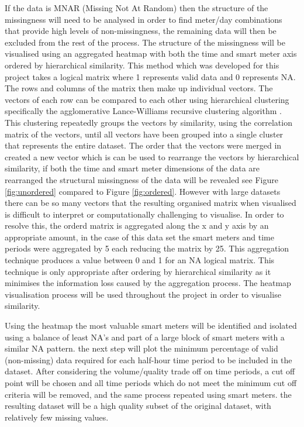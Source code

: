 If the data is MNAR (Missing Not At Random) then the structure of the missingness will need to be analysed in order to find meter/day combinations that provide high levels of non-missingness, the remaining data will then be excluded from the rest of the process. The structure of the missingness will be visualised using an aggregated heatmap with both the time and smart meter axis ordered by hierarchical similarity. This method which was developed for this project takes a logical matrix where 1 represents valid data and 0 represents NA. The rows and columns of the matrix then make up individual vectors. The vectors of each row can be compared to each other using hierarchical clustering specifically the agglomerative Lance-Williams recursive clustering algorithm \cite{lance1967}. This clustering repeatedly groups the vectors by similarity, using the correlation matrix of the vectors, until all vectors have been grouped into a single cluster that represents the entire dataset. The order that the vectors were merged in created a new vector which is can be used to rearrange the vectors by hierarchical similarity, if both the time and smart meter dimensions of the data are rearranged the structural missingness of the data will be revealed see Figure \ref{fig:unordered} compared to Figure \ref{fig:ordered}. However with large datasets there can be so many vectors that the resulting organised matrix when visualised is difficult to interpret or computationally challenging to visualise. In order to resolve this, the orderd matrix is aggregated along the x and y axis by an appropriate amount, in the case of this data set the smart meters and time periods were aggregated by 5 each reducing the matrix by 25. This aggregation technique produces a value between 0 and 1 for an NA logical matrix. This technique is only appropriate after ordering by hierarchical similarity as it minimises the information loss caused by the aggregation process. The heatmap visualisation process will be used throughout the project in order to visualise similarity.

Using the heatmap the most valuable smart meters will be identified and isolated using a balance of least NA's and part of a large block of smart meters with a similar NA pattern. the next step will plot the minimum percentage of valid (non-missing) data required for each half-hour time period to be included in the dataset. After considering the volume/quality trade off on time periods, a cut off point will be chosen and all time periods which do not meet the minimum cut off criteria will be removed, and the same process repeated using smart meters. the resulting dataset will be a high quality subset of the original dataset, with relatively few missing values.

